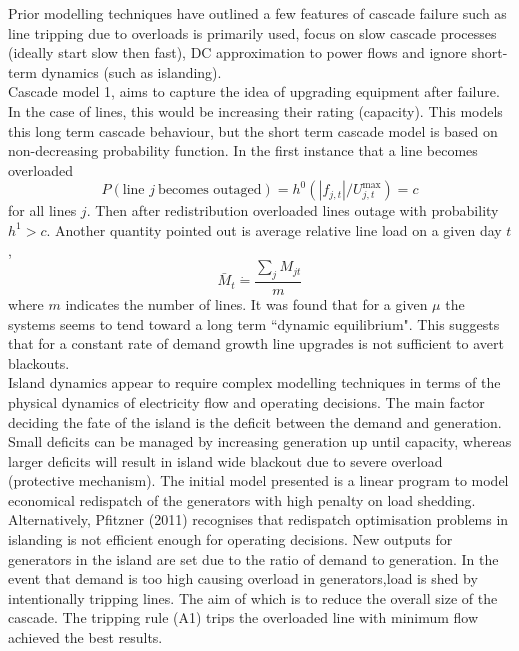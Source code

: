 \documentclass{article}
\begin{document}
Prior modelling techniques have outlined a few features of cascade failure such as line tripping due to overloads is primarily used, focus on slow cascade processes (ideally start slow then fast), DC approximation to power flows and ignore short-term dynamics (such as islanding). \\

Cascade model 1, aims to capture the idea of upgrading equipment after failure. In the case of lines, this would be increasing their rating (capacity). This models this long term cascade behaviour, but the short term cascade model is based on non-decreasing probability function. In the first instance that a line becomes overloaded
\begin{equation}
P(\text{line } j \ \text{becomes outaged}) = h^0(|f_{j,t}|/U_{j,t}^{\text{max}})=c
\end{equation}
for all lines $j$. Then after redistribution overloaded lines outage with probability $h^1>c$. Another quantity pointed out is average relative line load on a given day $t$,
\begin{equation}
\bar{M}_t \dot{=}\frac{\sum_j M_{jt}}{m}
\end{equation}
where $m$ indicates the number of lines. It was found that for a given $\mu$ the systems seems to tend toward a long term ``dynamic equilibrium". This suggests that for a constant rate of demand growth line upgrades is not sufficient to avert blackouts.\\

Island dynamics appear to require complex modelling techniques in terms of the physical dynamics of electricity flow and operating decisions. The main factor deciding the fate of the island is the deficit between the demand and generation. Small deficits can be managed by increasing generation up until capacity, whereas larger deficits will result in island wide blackout due to severe overload (protective mechanism). The initial model presented is a linear program to model economical redispatch of the generators with high penalty on load shedding. Alternatively, Pfitzner (2011) recognises that redispatch optimisation problems in islanding is not efficient enough for operating decisions. New outputs for generators in the island are set due to the ratio of demand to generation. In the event that demand is too high causing overload in generators,load is shed by intentionally tripping lines. The aim of which is to reduce the overall size of the cascade. The tripping rule (A1) trips the overloaded line with minimum flow achieved the best results.  
\end{document}
